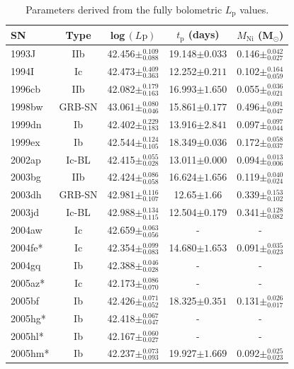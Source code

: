 \documentclass[a4paper,fleqn,usenatbib]{mnras}
\begin{document}
\begin{table}
\renewcommand{\arraystretch}{1.5}
 \centering
 \begin{minipage}{110mm}
  \caption{Parameters derived from the fully bolometric $L_{\mathrm{p}}$ values.}
 \begin{tabular}{lcccc}
  \hline
 SN & Type & log\,$(L{\mathrm{p}})$  & $t_{\mathrm{p}}$ (days) &  $M_{\mathrm{Ni}}$ (M$_{\odot}$)  \\
  \hline

1993J & IIb & 42.456$\pm^{0.109}_{0.088}$ &19.148$\pm{0.033}$ &0.146$\pm^{0.042}_{0.027}$ \\
1994I & Ic & 42.473$\pm^{0.409}_{0.363}$ &12.252$\pm{0.211}$ &0.102$\pm^{0.164}_{0.059}$ \\
1996cb & IIb & 42.082$\pm^{0.179}_{0.163}$ &16.993$\pm{1.650}$ &0.055$\pm^{0.036}_{0.021}$ \\
1998bw & GRB-SN & 43.061$\pm^{0.080}_{0.046}$ &15.861$\pm{0.177}$ &0.496$\pm^{0.091}_{0.047}$ \\
1999dn & Ib & 42.402$\pm^{0.229}_{0.183}$ &13.916$\pm{2.841}$ &0.097$\pm^{0.097}_{0.044}$ \\
1999ex & Ib & 42.544$\pm^{0.124}_{0.105}$ &18.349$\pm{0.036}$ &0.172$\pm^{0.058}_{0.037}$ \\
2002ap & Ic-BL & 42.415$\pm^{0.055}_{0.028}$ &13.011$\pm{0.000}$ &0.094$\pm^{0.013}_{0.006}$ \\
2003bg & IIb & 42.424$\pm^{0.086}_{0.058}$ &16.624$\pm{1.656}$ &0.119$\pm^{0.040}_{0.024}$ \\
2003dh & GRB-SN & 42.981$\pm^{0.116}_{0.107}$ &12.65$\pm{1.66}$ &0.339$\pm^{0.153}_{0.102}$ \\
2003jd & Ic-BL & 42.988$\pm^{0.134}_{0.115}$ &12.504$\pm{0.179}$ &0.341$\pm^{0.128}_{0.082}$ \\
2004aw & Ic & 42.659$\pm^{0.063}_{0.056}$ &- &- \\
2004fe* & Ic & 42.354$\pm^{0.099}_{0.083}$ &14.680$\pm{1.653}$ &0.091$\pm^{0.035}_{0.023}$ \\
2004gq & Ib & 42.388$\pm^{0.046}_{0.028}$ &- &- \\
2005az* & Ic & 42.173$\pm^{0.086}_{0.070}$ &- &- \\
2005bf & Ib & 42.426$\pm^{0.071}_{0.052}$ &18.325$\pm{0.351}$ &0.131$\pm^{0.026}_{0.017}$ \\
2005hg* & Ib & 42.418$\pm^{0.067}_{0.047}$ &- &- \\
2005hl* & Ib & 42.167$\pm^{0.060}_{0.027}$ &- &- \\
2005hm* & Ib & 42.237$\pm^{0.073}_{0.093}$ &19.927$\pm{1.669}$ &0.092$\pm^{0.025}_{0.023}$ \\

\end{tabular}
\end{minipage}
\end{table}
\end{document}

